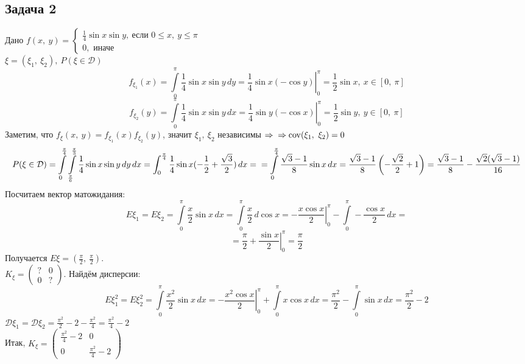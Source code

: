 \documentclass[12pt, a4paper]{article}
\newcommand{\cov}{\operatorname{cov}}
\begin{document}
    \subsection*{Задача 2}
    Дано $f(x,\ y) = \begin{cases}
        \frac{1}{4}\sin x \sin y,\ \text{если } 0\leq x,\ y \leq \pi\\
        0, \text{ иначе}
    \end{cases}$\\
    $\xi = (\xi_1,\ \xi_2),\ P(\xi\in \mathcal{D})$
    \[f_{\xi_1}(x) = \int\limits_0^{\pi} \frac{1}{4}\sin x \sin y\, dy = \left.\frac{1}{4}\sin x (-\cos y)\right|_0^{\pi} = \frac{1}{2}\sin x,\ x\in [0,\ \pi]\]
    \[f_{\xi_2}(y) = \int\limits_0^{\pi} \frac{1}{4}\sin x \sin y\, dx = \left.\frac{1}{4}\sin y (-\cos x)\right|_0^{\pi} = \frac{1}{2}\sin y,\ y\in [0,\ \pi]\]
    Заметим, что $f_{\xi}(x,\ y) = f_{\xi_1}(x) f_{\xi_2}(y)$, значит $\xi_1,\ \xi_2$ независимы $\Rightarrow\\
    \Rightarrow\cov(\xi_1,\ \xi_2) = 0$\\
    \[\displaystyle P(\xi \in \mathcal{D}) = \int\limits_{0}^{\frac{\pi}{4}}\int\limits_{\frac{\pi}{6}}^{\frac{\pi}{3}} \frac{1}{4}\sin x \sin y\, dy \, dx = \int_0^{\frac{\pi}{4}} \frac{1}{4}\sin x(-\frac{1}{2} + \frac{\sqrt{3}}{2})\, dx =\\
    = \int\limits_0^{\frac{\pi}{4}} \frac{\sqrt{3} - 1}{8} \sin x \, dx = \frac{\sqrt{3} - 1}{8}\left(-\frac{\sqrt{2}}{2} + 1\right) = \frac{\sqrt{3} - 1}{8} - \frac{\sqrt{2}(\sqrt{3} - 1)}{16}\]
    Посчитаем вектор матожидания:\\
    \[E\xi_1 = E\xi_2 = \int\limits_0^{\pi} \frac{x}{2}\sin x\, dx = \int\limits_0^{\pi}\frac{x}{2}\, d\cos x = \left.-\frac{x\cos x}{2}\right|_0^{\pi} - \int\limits_0^{\pi} -\frac{\cos x}{2}\, dx =\]
    \[= \frac{\pi}{2} + \left.\frac{\sin x}{2}\right|_0^{\pi} = \frac{\pi}{2}\]
    Получается $E\xi = (\frac{\pi}{2},\ \frac{\pi}{2})$.\\
    $K_{\xi} = \begin{pmatrix}
        ? & 0\\
        0 & ?
    \end{pmatrix}$. Найдём дисперсии:
    \[E\xi_1^2 = E\xi_2^2 = \int\limits_0^{\pi} \frac{x^2}{2} \sin x\, dx = \left.-\frac{x^2\cos x}{2}\right|_0^{\pi} + \int\limits_0^{\pi}x\cos x\, dx = \frac{\pi^2}{2} - \int\limits_0^{\pi} \sin x \, dx = \frac{\pi^2}{2} - 2\]
    $\mathcal{D}\xi_1 = \mathcal{D}\xi_2 = \frac{\pi^2}{2} - 2 - \frac{\pi^2}{4} = \frac{\pi^2}{4} - 2$\\
    Итак, $K_{\xi} = \begin{pmatrix}
        \frac{\pi^2}{4} - 2 & 0\\
        0 & \frac{\pi^2}{4} - 2
    \end{pmatrix}$
\end{document}

